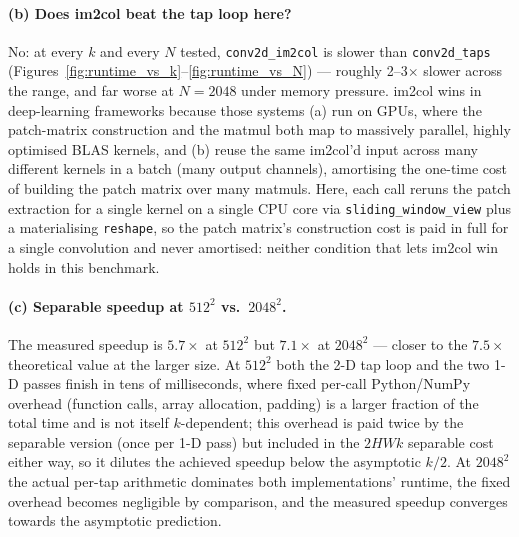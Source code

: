 \documentclass[11pt]{article}
\begin{document}
\paragraph{(b) Does im2col beat the tap loop here?}
No: at every $k$ and every $N$ tested, \texttt{conv2d\_im2col} is slower than
\texttt{conv2d\_taps} (Figures~\ref{fig:runtime_vs_k}--\ref{fig:runtime_vs_N}) --- roughly
2--3$\times$ slower across the range, and far worse at $N{=}2048$ under memory pressure. im2col
wins in deep-learning frameworks because those systems (a) run on GPUs, where the patch-matrix
construction and the matmul both map to massively parallel, highly optimised BLAS kernels, and
(b) reuse the same im2col'd input across many different kernels in a batch (many output
channels), amortising the one-time cost of building the patch matrix over many matmuls. Here,
each call reruns the patch extraction for a single kernel on a single CPU core via
\texttt{sliding\_window\_view} plus a materialising \texttt{reshape}, so the patch matrix's
construction cost is paid in full for a single convolution and never amortised: neither condition
that lets im2col win holds in this benchmark.

\paragraph{(c) Separable speedup at $512^2$ vs.\ $2048^2$.}
\begin{table}[H]
\centering

\caption{\texttt{conv2d\_separable} speedup over \texttt{conv2d\_taps} at $k=15$ (theoretical
$k/2=7.5\times$).}
\label{tab:speedup_table}
\end{table}
The measured speedup is $5.7\times$ at $512^2$ but $7.1\times$ at $2048^2$ --- closer to the
$7.5\times$ theoretical value at the larger size. At $512^2$ both the 2-D tap loop and the two
1-D passes finish in tens of milliseconds, where fixed per-call Python/NumPy overhead (function
calls, array allocation, padding) is a larger fraction of the total time and is not itself
$k$-dependent; this overhead is paid twice by the separable version (once per 1-D pass) but
included in the $2HWk$ separable cost either way, so it dilutes the achieved speedup below the
asymptotic $k/2$. At $2048^2$ the actual per-tap arithmetic dominates both implementations'
runtime, the fixed overhead becomes negligible by comparison, and the measured speedup converges
towards the asymptotic prediction.

\end{document}
